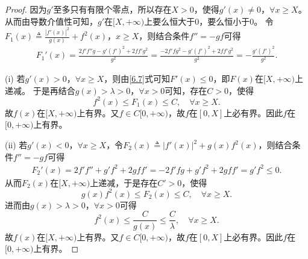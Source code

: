 \documentclass[../../main.tex]{subfiles}%
\begin{document}
\begin{proof}
因为\(g'\)至多只有有限个零点，所以存在\(X>0\)，使得\(g'( x ) \ne 0\)，\(\forall x\geqslant X\)。从而由导数介值性可知，\(g'\)在\([ X,+\infty )\)上要么恒大于\(0\)，要么恒小于\(0\)。
令\(F_1( x ) \triangleq \frac{| f'( x ) |^2}{g( x )}+f^2( x )\)，\(x\geqslant X\)，则结合条件\(f'' =-gf\)可得
\begin{align}
F_{1}'( x ) =\frac{2f'f'' g-g'( f' )^2+2ff' g^2}{g^2}=\frac{-2f'fg^2-g'( f' )^2+2ff'g^2}{g^2}=-\frac{g'( f' )^2}{g^2}. \label{6.7}
\end{align}

(i) 若\(g'( x ) >0\)，\(\forall x\geqslant X\)，则由\eqref{6.7}式可知\(F'( x ) \leqslant 0\)，即\(F( x )\)在\([ X,+\infty )\)上递减。
于是再结合\(g( x ) >\lambda >0\)，\(\forall x>0\)可知，存在\(C>0\)，使得
\[
f^2( x ) \leqslant F_1( x ) \leqslant C,\quad\forall x\geqslant X.
\]
故\(f( x )\)在\([ X,+\infty )\)上有界。又\(f\in C[ 0,+\infty )\)，故\(f\)在\([ 0,X ]\)上必有界。因此\(f\)在\([ 0,+\infty )\)上有界。

(ii) 若\(g'( x ) <0\)，\(\forall x\geqslant X\)，令\(F_2( x ) \triangleq | f'( x ) |^2+g( x ) f^2( x )\)，则结合条件\(f'' =-gf\)可得
\begin{align}
F_{2}'( x ) =2f'f'' +g'f^2+2gff' =-2f'fg+g'f^2+2gff' =g'f^2\leqslant 0. \label{6.8}
\end{align}
从而\(F_2( x )\)在\([ X,+\infty )\)上递减，于是存在\(C'>0\)，使得
\[
g( x ) f^2( x ) \leqslant F_2( x ) \leqslant C,\quad\forall x\geqslant X.
\]
进而由\(g( x ) >\lambda >0\)，\(\forall x>0\)可得
\[
f^2( x ) \leqslant \frac{C}{g( x )}\leqslant \frac{C}{\lambda},\quad\forall x\geqslant X.
\]
故\(f( x )\)在\([ X,+\infty )\)上有界。又\(f\in C[ 0,+\infty )\)，故\(f\)在\([ 0,X ]\)上必有界。因此\(f\)在\([ 0,+\infty )\)上有界。
\end{proof}
\end{document}
